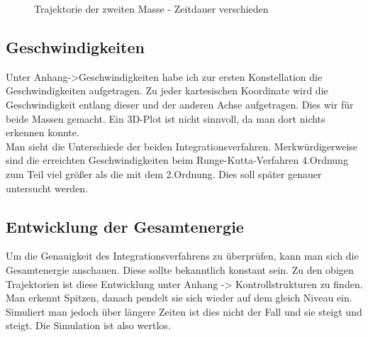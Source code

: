 \documentclass[12pt,a4paper,titlepage,headinclude,bibtotoc]{scrartcl}
\begin{document}
\begin{figure}[!htb]
	\centering
	  \hfill
	\caption{Trajektorie der zweiten Masse - Zeitdauer verschieden}
\end{figure}

\subsection{Geschwindigkeiten}
Unter Anhang->Geschwindigkeiten habe ich zur ersten Konstellation die Geschwindigkeiten aufgetragen. Zu jeder kartesischen Koordinate wird die Geschwindigkeit entlang dieser und der anderen Achse aufgetragen.
Dies wir für beide Massen gemacht.
Ein 3D-Plot ist nicht sinnvoll, da man dort nichts erkennen konnte.\\
Man sieht die Unterschiede der beiden Integrationsverfahren.
Merkwürdigerweise sind die erreichten Geschwindigkeiten beim Runge-Kutta-Verfahren 4.Ordnung zum Teil viel größer als die mit dem 2.Ordnung.
Dies soll später genauer untersucht werden.

\subsection{Entwicklung der Gesamtenergie}
Um die Genauigkeit des Integrationsverfahrens zu überprüfen, kann man sich die Gesamtenergie anschauen.
Diese sollte bekanntlich konstant sein.
Zu den obigen Trajektorien ist diese Entwicklung unter Anhang -> Kontrollstrukturen zu finden.
Man erkennt Spitzen, danach pendelt sie sich wieder auf dem gleich Niveau ein.
Simuliert man jedoch über längere Zeiten ist dies nicht der Fall und sie steigt und steigt. Die Simulation ist also wertlos.
\end{document}
